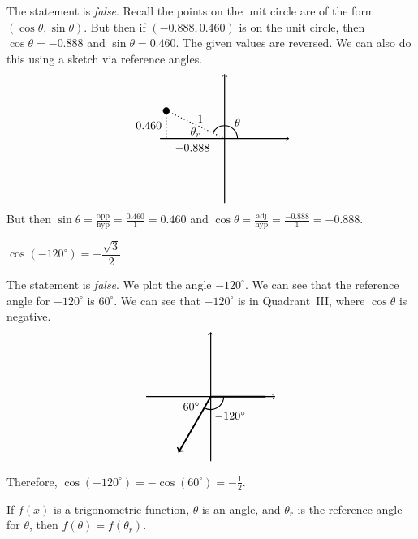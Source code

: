 \documentclass[11pt,letterpaper]{article}
\begin{document}
\sol The statement is \textit{false}. Recall the points on the unit circle are of the form $(\cos \theta, \sin \theta)$. But then if $(-0.888,0.460)$ is on the unit circle, then $\cos \theta= -0.888$ and $\sin \theta= 0.460$. The given values are reversed. We can also do this using a sketch via reference angles. 
	\[
	\begin{tikzpicture}
	\draw[line width=0.03cm,->] (-2,0) -- (2,0);				%
	\draw[line width=0.03cm,->] (0,-2) -- (0,2);				%
	
	\draw[fill=black] (-1.80613, 0.859016) circle (0.1);		%
	\draw[line width=0.03cm,dotted] (-1.80613, 0.859016) -- (-1.80613,0);	%
	\draw[line width=0.03cm,dotted] (-1.80613, 0.859016) -- (0,0);			%
	\draw[line width=0.03cm] (0.4,0) arc (0:154.564:0.4); \node at (0.4,0.5) {$\theta$};	%

	\node at (-1,-0.3) {$-0.888$};	%
	\node at (-2.35,0.4) {$0.460$};	%
	\node at (-0.75,0.6) {$1$};		%
	\node at (-0.9,0.2) {$\theta_r$};	%
	\end{tikzpicture}
	\]
But then $\sin \theta= \frac{\text{opp}}{\text{hyp}}= \frac{0.460}{1}= 0.460$ and $\cos \theta= \frac{\text{adj}}{\text{hyp}}= \frac{-0.888}{1}= -0.888$. \pvspace{1.3cm}



 $\cos(-120^\circ)= -\dfrac{\sqrt{3}}{2}$ \pspace

\sol The statement is \textit{false}. We plot the angle $-120^\circ$. We can see that the reference angle for $-120^\circ$ is $60^\circ$. We can see that $-120^\circ$ is in Quadrant~III, where $\cos \theta$ is negative. 
	\[
	\begin{tikzpicture}
	\draw[line width=0.03cm,->] (-2,0) -- (2,0);				%
	\draw[line width=0.03cm,->] (0,-2) -- (0,2);				%
	
	\draw[fill=black,line width=0.05cm] (0,0) -- (1.7,0);		%
	\draw[fill=black,->,line width=0.05cm] (0,0) -- (-1,-1.732);	%
	\draw[line width=0.03cm] (0.4,0) arc (0:-120:0.4);		%
	
	\node at (-0.6,-0.3) {$60^\circ$};	%
	\node at (0.6,-0.6) {$-120^\circ$};	%
	\end{tikzpicture}
	\]

Therefore, $\cos(-120^\circ)= - \cos(60^\circ)= -\frac{1}{2}$. \pvspace{1.3cm}



 If $f(x)$ is a trigonometric function, $\theta$ is an angle, and $\theta_r$ is the reference angle for $\theta$, then $f(\theta)= f(\theta_r)$. \pspace
\end{document}
